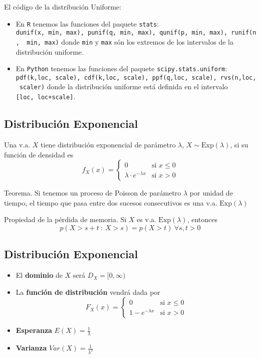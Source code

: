 \documentclass[
]{article}
\providecommand{\tightlist}{%
  \setlength{\itemsep}{0pt}\setlength{\parskip}{0pt}}
\begin{document}
El código de la distribución Uniforme:

\begin{itemize}
\tightlist
\item
  En \texttt{R} tenemos las funciones del paquete \texttt{stats}:
  \texttt{dunif(x,\ min,\ max),\ punif(q,\ min,\ max),\ qunif(p,\ min,\ max),\ runif(n,\ \ min,\ max)}
  donde \texttt{min} y \texttt{max} són los extremos de los intervalos
  de la distribución uniforme.
\item
  En \texttt{Python} tenemos las funciones del paquete
  \texttt{scipy.stats.uniform}:
  \texttt{pdf(k,loc,\ scale),\ cdf(k,loc,\ scale),\ ppf(q,loc,\ scale),\ rvs(n,loc,\ scaler)}
  donde la distribución uniforme está definida en el intervalo
  \texttt{{[}loc,\ loc+scale{]}}.
\end{itemize}

\hypertarget{distribuciuxf3n-exponencial}{%
\subsection{Distribución
Exponencial}\label{distribuciuxf3n-exponencial}}

Una v.a. \(X\) tiene distribución exponencial de parámetro \(\lambda\),
\(X\sim\text{Exp}(\lambda)\), si su función de densidad es
\[f_X(x)=\left\{
\begin{array}{rl}
     0 & \text{si }  x\le 0
  \\ \lambda\cdot e^{-\lambda x} & \text{si }x>0
\end{array}
\right.\]

Teorema. Si tenemos un proceso de Poisson de parámetro \(\lambda\) por
unidad de tiempo, el tiempo que pasa entre dos sucesos consecutivos es
una v.a. \(\text{Exp}(\lambda)\)

Propiedad de la pérdida de memoria. Si \(X\) es v.a.
\(\text{Exp}(\lambda)\), entonces
\[p(X>s+t\ :\ X>s)=p(X>t)\ \forall s,t>0\]

\hypertarget{distribuciuxf3n-exponencial-1}{%
\subsection{Distribución
Exponencial}\label{distribuciuxf3n-exponencial-1}}

\begin{itemize}
\item
  El \textbf{dominio} de \(X\) será \(D_X = [0,\infty)\)
\item
  La \textbf{función de distribución} vendrá dada por \[F_X(x)=\left\{
  \begin{array}{rl}
    0 & \text{si } x\le 0
  \\ 1-e^{-\lambda x} & \text{si } x>0
  \end{array}
  \right.\]
\item
  \textbf{Esperanza} \(E(X) = \frac{1}{\lambda}\)
\item
  \textbf{Varianza} \(Var(X) = \frac{1}{\lambda^2}\)
\end{itemize}
\end{document}
